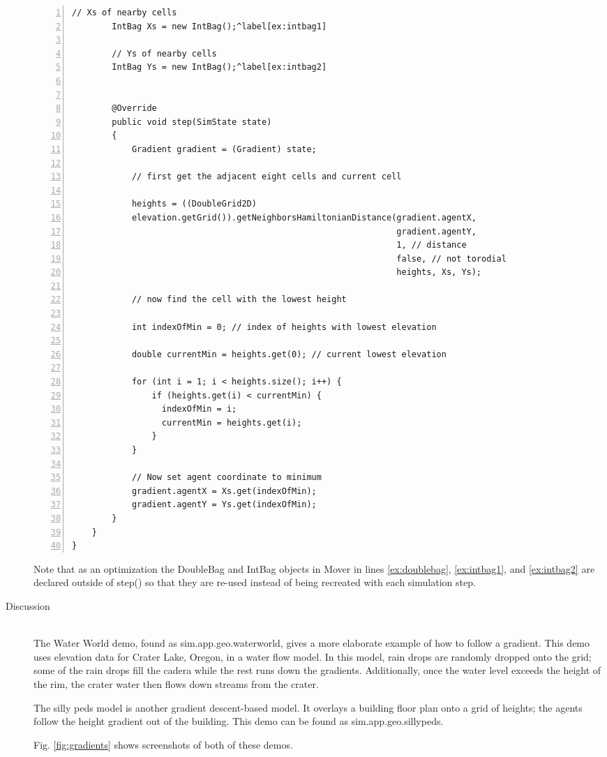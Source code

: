 \documentclass[twoside,10pt]{book}
\newcommand\class[1]{\index{Classes!{#1}}\textsf{#1}}
\newcommand\method[1]{\textsf{#1}}
\newcommand\code[1]{\textsf{#1}}
\begin{document}
\begin{description}
\begin{Verbatim}[frame=lines,framesep=5mm,numbers=left,commandchars=^\[\]]
        // Xs of nearby cells
        IntBag Xs = new IntBag();^label[ex:intbag1]

        // Ys of nearby cells
        IntBag Ys = new IntBag();^label[ex:intbag2]


        @Override
        public void step(SimState state)
        {
            Gradient gradient = (Gradient) state;

            // first get the adjacent eight cells and current cell

            heights = ((DoubleGrid2D)
            elevation.getGrid()).getNeighborsHamiltonianDistance(gradient.agentX,
                                                                 gradient.agentY,
                                                                 1, // distance
                                                                 false, // not torodial
                                                                 heights, Xs, Ys);

            // now find the cell with the lowest height

            int indexOfMin = 0; // index of heights with lowest elevation

            double currentMin = heights.get(0); // current lowest elevation

            for (int i = 1; i < heights.size(); i++) {
                if (heights.get(i) < currentMin) { 
                  indexOfMin = i;
                  currentMin = heights.get(i);
                }
            }

            // Now set agent coordinate to minimum
            gradient.agentX = Xs.get(indexOfMin);
            gradient.agentY = Ys.get(indexOfMin);
        }
    }
}
\end{Verbatim}

Note that as an optimization the \class{DoubleBag} and \class{IntBag}
objects in \code{Mover} in lines \ref{ex:doublebag}, \ref{ex:intbag1},
and \ref{ex:intbag2} are declared outside of \method{step()} so that
they are re-used instead of being recreated with each simulation step.

\item[Discussion]~\\
  The Water World demo, found as \code{sim.app.geo.waterworld}, gives
  a more elaborate example of how to follow a gradient.  This demo
  uses elevation data for Crater Lake, Oregon, in a water flow model.
  In this model, rain drops are randomly dropped onto the grid; some
  of the rain drops fill the cadera while the rest runs down the
  gradients. Additionally, once the water level exceeds the height of
  the rim, the crater water then flows down streams from the crater.

  The silly peds model is another gradient descent-based model.  It
  overlays a building floor plan onto a grid of heights; the agents
  follow the height gradient out of the building.  This demo can be
  found as \code{sim.app.geo.sillypeds}.

  Fig. \ref{fig:gradients} shows screenshots of both of these demos.
\end{description}
\end{document}
